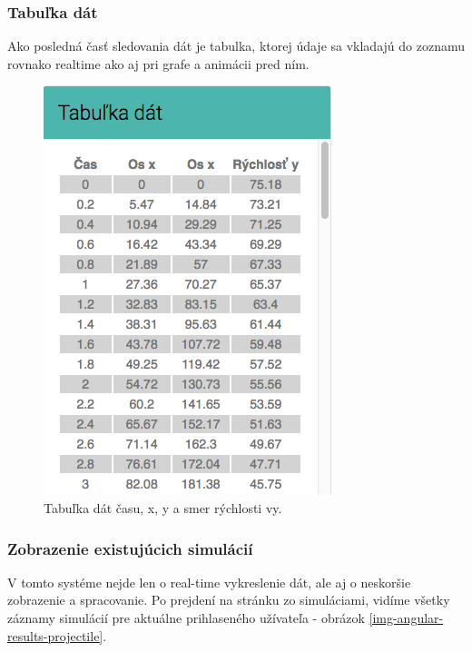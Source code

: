\subsubsection{Tabuľka dát}
Ako posledná časť sledovania dát je tabulka, ktorej údaje sa vkladajú do zoznamu rovnako realtime ako aj pri grafe a animácii pred ním.

\begin{figure}[H]
  \centering
  \includegraphics[scale=0.6]{img/code/angular-table.png}
  \caption{Tabuľka dát času, x, y a smer rýchlosti vy.}
  \label{img-angular-table}
\end{figure}


\subsubsection{Zobrazenie existujúcich simulácií}
V tomto systéme nejde len o real-time vykreslenie dát, ale aj o neskoršie zobrazenie a spracovanie. Po prejdení na stránku zo simuláciami, vidíme všetky záznamy simulácií pre aktuálne prihlaseného užívateľa - obrázok \ref{img-angular-results-projectile}.

